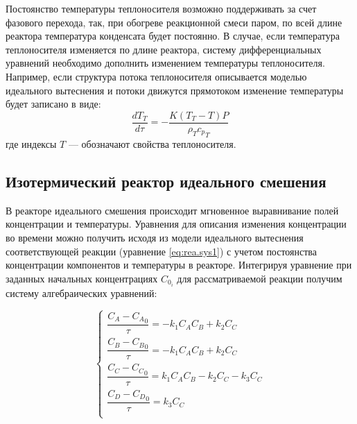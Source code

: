 Постоянство температуры теплоносителя возможно поддерживать за счет фазового перехода, так, при обогреве реакционной смеси паром, по всей длине реактора температура конденсата будет постоянно. В случае, если температура теплоносителя изменяется по длине реактора, систему дифференциальных уравнений необходимо дополнить изменением температуры теплоносителя. Например, если структура потока теплоносителя описывается моделью идеального вытеснения и потоки движутся прямотоком изменение температуры будет записано в виде:
\begin{equation}
	\dfrac{d T_T}{d \tau} = -\dfrac{K(T_T-T)P}{\rho_T {c_p}_T}
\end{equation}
где индексы $T$ --- обозначают свойства теплоносителя.


\subsection*{Изотермический реактор идеального смешения}
В реакторе идеального смешения происходит мгновенное выравнивание полей концентрации и температуры. Уравнения для описания изменения концентрации во времени можно получить исходя из модели идеального вытеснения соответствующей реакции (уравнение \eqref{eq:rea.sys1}) с учетом постоянства концентрации компонентов и температуры в реакторе. Интегрируя уравнение при заданных начальных концентрациях  $C_{0_i}$  для рассматриваемой реакции получим систему алгебраических уравнений:

\begin{equation}\label{eq:rea.syssmis}
\left\lbrace 
\begin{gathered} 
\dfrac{C_A - {C_A}_0} {\tau} = -k_1 C_A C_B +k_2 C_C \\
\dfrac{C_B - {C_B}_0} {\tau} = -k_1 C_A C_B +k_2 C_C \\
\dfrac{C_C - {C_C}_0} {\tau} = k_1 C_A C_B -k_2 C_C - k_3 C_C \\
\dfrac{C_D - {C_D}_0} {\tau} = k_3 C_C \\
\end{gathered} 
\right.
\end{equation}



 
 
